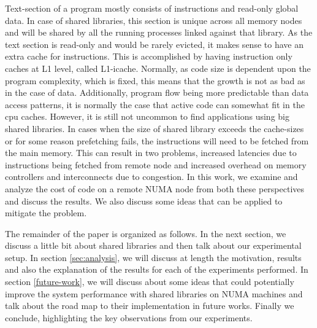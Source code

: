 Text-section of a program mostly consists of instructions and read-only global data. In case of shared libraries, this section
is unique across all memory nodes and will be shared by all the running processes linked against that library. As the text
section is read-only and would be rarely evicted, it makes sense to have an extra cache for instructions. This is accomplished
by having instruction only caches at L1 level, called L1-icache. Normally, as code size is dependent upon the program complexity,
which is fixed, this means that the growth is not as bad as in the case of data. Additionally, program flow being more predictable
than data access patterns, it is normally the case that active code can somewhat fit in the cpu caches.
However, it is still not uncommon to find applications using big shared libraries. In cases when the size of shared library exceeds
the cache-sizes or for some reason prefetching fails, the instructions will need to be fetched from the main memory.
This can result in two problems, increased latencies due to instructions being fetched from remote node and increased overhead on
memory controllers and interconnects due to congestion. In this work, we examine and analyze the cost of code on a remote NUMA
node from both these perspectives and discuss the results. We also discuss some ideas that can be applied to mitigate the problem.

The remainder of the paper is organized as follows. In the next section, we discuss a little bit about shared libraries and 
then talk about our experimental setup. In section \ref{sec:analysis}, we will discuss at length the motivation, results and also the explanation
of the results for each of the experiments performed. In section \ref{future-work}, we will discuss about some ideas that could potentially improve
the system performance with shared libraries on NUMA machines and talk about the road map to their implementation in future works.
Finally we conclude, highlighting the key observations from our experiments.

